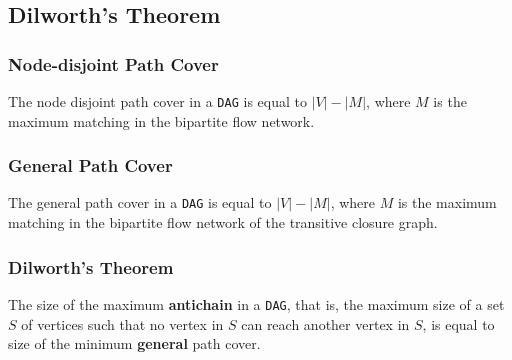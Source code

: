 \subsection{Dilworth's Theorem}

\subsubsection{Node-disjoint Path Cover}

The node disjoint path cover in a {\tt DAG} is equal to $|V| - |M|$, where $M$ is the maximum matching in the bipartite flow network.

\subsubsection{General Path Cover}

The general path cover in a {\tt DAG} is equal to $|V| - |M|$, where $M$ is the maximum matching in the bipartite flow network of the transitive closure graph.

\subsubsection{Dilworth's Theorem}

The size of the maximum \textbf{antichain} in a {\tt DAG}, that is, the maximum size of a set $S$ of vertices such that no vertex in $S$ can reach another vertex in $S$, is equal to size of the minimum \textbf{general} path cover.
